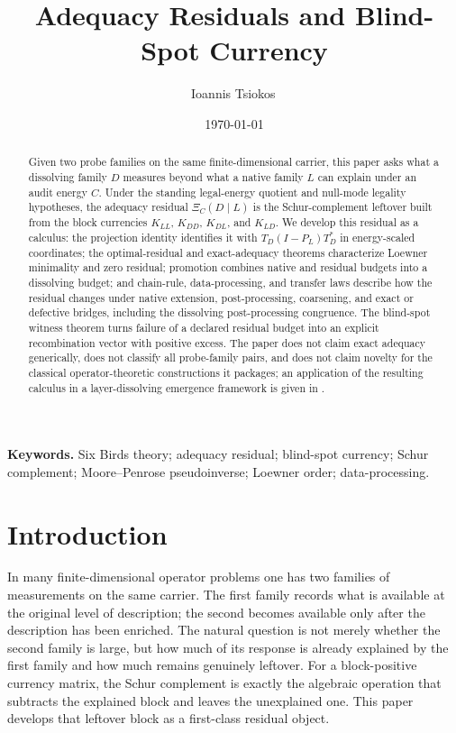 \documentclass[11pt]{article}
\title{Adequacy Residuals and Blind-Spot Currency}
\author{Ioannis Tsiokos\,\orcidlink{0009-0009-7659-5964}}
\date{\today}
\theoremstyle{definition}
\begin{document}
\maketitle
\thispagestyle{firstpage}

\begin{abstract}
Given two probe families on the same finite-dimensional carrier, this paper asks what a dissolving family \(D\) measures beyond what a native family \(L\) can explain under an audit energy \(C\).  Under the standing legal-energy quotient and null-mode legality hypotheses, the adequacy residual \(\Xi_C(D\mid L)\) is the Schur-complement leftover built from the block currencies \(K_{LL}\), \(K_{DD}\), \(K_{DL}\), and \(K_{LD}\).  We develop this residual as a calculus: the projection identity identifies it with \(T_D(I-P_L)T_D^*\) in energy-scaled coordinates; the optimal-residual and exact-adequacy theorems characterize Loewner minimality and zero residual; promotion combines native and residual budgets into a dissolving budget; and chain-rule, data-processing, and transfer laws describe how the residual changes under native extension, post-processing, coarsening, and exact or defective bridges, including the dissolving post-processing congruence.  The blind-spot witness theorem turns failure of a declared residual budget into an explicit recombination vector with positive excess.  The paper does not claim exact adequacy generically, does not classify all probe-family pairs, and does not claim novelty for the classical operator-theoretic constructions it packages; an application of the resulting calculus in a layer-dissolving emergence framework is given in \citet{Tsiokos2026NeedleKiller}.
\end{abstract}

\medskip
\noindent\textbf{Keywords.} Six Birds theory; adequacy residual; blind-spot currency; Schur complement; Moore--Penrose pseudoinverse; Loewner order; data-processing.

\section{Introduction}
\label{sec:intro}

In many finite-dimensional operator problems one has two families of
measurements on the same carrier.  The first family records what is available at
the original level of description; the second becomes available only after the
description has been enriched.  The natural question is not merely whether the
second family is large, but how much of its response is already explained by the
first family and how much remains genuinely leftover.  For a block-positive
currency matrix, the Schur complement is exactly the algebraic operation that
subtracts the explained block and leaves the unexplained one.  This paper
develops that leftover block as a first-class residual object.
\end{document}
